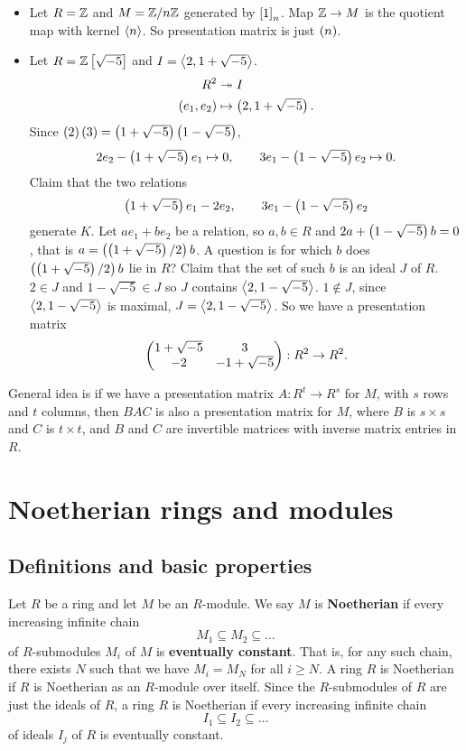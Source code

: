 \begin{example2}
\hfill
\begin{itemize}
\item Let $ R = \Z $ and $ M = \Z / n\Z $ generated by $ \sb{1}_n $. Map $ \Z \to M $ is the quotient map with kernel $ \ab{n} $. So presentation matrix is just $ \rb{n} $.
\item Let $ R = \Z\sb{\sqrt{-5}} $ and $ I = \ab{2, 1 + \sqrt{-5}} $.
\begin{align*}
R^2 & \twoheadrightarrow I \\
\rb{e_1, e_2} & \mapsto \rb{2, 1 + \sqrt{-5}}.
\end{align*}
Since $ \rb{2}\rb{3} = \rb{1 + \sqrt{-5}}\rb{1 - \sqrt{-5}} $,
$$ 2e_2 - \rb{1 + \sqrt{-5}}e_1 \mapsto 0, \qquad 3e_1 - \rb{1 - \sqrt{-5}}e_2 \mapsto 0. $$
Claim that the two relations
$$ \rb{1 + \sqrt{-5}}e_1 - 2e_2, \qquad 3e_1 - \rb{1 - \sqrt{-5}}e_2 $$
generate $ K $. Let $ ae_1 + be_2 $ be a relation, so $ a, b \in R $ and $ 2a + \rb{1 - \sqrt{-5}}b = 0 $, that is $ a = \rb{\rb{1 + \sqrt{-5}} / 2}b $. A question is for which $ b $ does $ \rb{\rb{1 + \sqrt{-5}} / 2}b $ lie in $ R $? Claim that the set of such $ b $ is an ideal $ J $ of $ R $. $ 2 \in J $ and $ 1 - \sqrt{-5} \in J $ so $ J $ contains $ \ab{2, 1 - \sqrt{-5}} $. $ 1 \notin J $, since $ \ab{2, 1 - \sqrt{-5}} $ is maximal, $ J = \ab{2, 1 - \sqrt{-5}} $. So we have a presentation matrix
$$ \two{1 + \sqrt{-5} & 3}{-2 & -1 + \sqrt{-5}} : R^2 \to R^2. $$
\end{itemize}
\end{example2}

General idea is if we have a presentation matrix $ A : R^t \to R^s $ for $ M $, with $ s $ rows and $ t $ columns, then $ BAC $ is also a presentation matrix for $ M $, where $ B $ is $ s \times s $ and $ C $ is $ t \times t $, and $ B $ and $ C $ are invertible matrices with inverse matrix entries in $ R $.

\pagebreak

\section{Noetherian rings and modules}

\subsection{Definitions and basic properties}

\begin{definition}
Let $ R $ be a ring and let $ M $ be an $ R $-module. We say $ M $ is \textbf{Noetherian} if every increasing infinite chain
$$ M_1 \subseteq M_2 \subseteq \dots $$
of $ R $-submodules $ M_i $ of $ M $ is \textbf{eventually constant}. That is, for any such chain, there exists $ N $ such that we have $ M_i = M_N $ for all $ i \ge N $. A ring $ R $ is Noetherian if $ R $ is Noetherian as an $ R $-module over itself. Since the $ R $-submodules of $ R $ are just the ideals of $ R $, a ring $ R $ is Noetherian if every increasing infinite chain
$$ I_1 \subseteq I_2 \subseteq \dots $$
of ideals $ I_j $ of $ R $ is eventually constant.
\end{definition}

